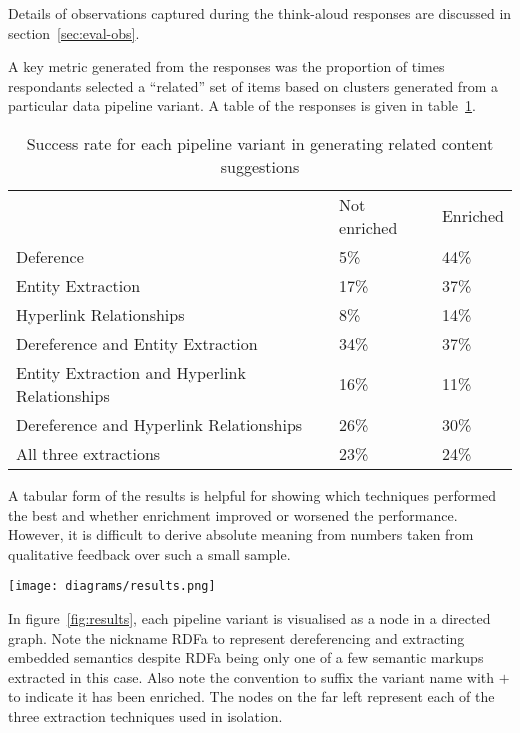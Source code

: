 Details of observations captured during the think-aloud responses
are discussed in section~\ref{sec:eval-obs}.

A key metric generated from the responses was the proportion of times
respondants selected a ``related'' set of items based on clusters
generated from a particular data pipeline variant. A table of the
responses is given in table~\ref{tbl:results}.

\begin{table}[h]
  \centering
  \caption{Success rate for each pipeline variant in generating related content suggestions}
  \label{tbl:results}
  \begin{tabular}{lll}
    & Not enriched & Enriched \\
    Deference                                     & 5\%          & 44\%     \\
    Entity Extraction                             & 17\%         & 37\%     \\
    Hyperlink Relationships                       & 8\%          & 14\%     \\
    Dereference and Entity Extraction             & 34\%         & 37\%     \\
    Entity Extraction and Hyperlink Relationships & 16\%         & 11\%     \\
    Dereference and Hyperlink Relationships       & 26\%         & 30\%     \\
    All three extractions                         & 23\%         & 24\%     
  \end{tabular}
\end{table}

A tabular form of the results is helpful for showing which techniques
performed the best and whether enrichment improved or worsened the
performance. However, it is difficult to derive absolute meaning
from numbers taken from qualitative feedback over such a small
sample.

\begin{sidewaysfigure}
  \begin{center}
    \texttt{[image: diagrams/results.png]}
  \end{center}
  \caption{Visualisation of performance of each data pipeline variant\label{fig:results}}
\end{sidewaysfigure}


In figure~\ref{fig:results}, each pipeline variant is visualised
as a node in a directed graph. Note the nickname RDFa to represent
dereferencing and extracting embedded semantics despite RDFa being
only one of a few semantic markups extracted in this case. Also note
the convention to suffix the variant name with $+$ to indicate it
has been enriched. The nodes
on the far left represent each of the three extraction techniques
used in isolation.

